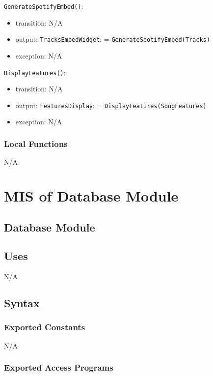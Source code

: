 \documentclass[12pt, titlepage]{article}
\begin{document}
\noindent \texttt{GenerateSpotifyEmbed()}:
\begin{itemize}
\item transition: N/A
\item output: \texttt{Tracks\textunderscore Embed\textunderscore Widget}: = \texttt{GenerateSpotifyEmbed(Tracks)}
\item exception: N/A
\end{itemize}

\noindent \texttt{DisplayFeatures()}:
\begin{itemize}
\item transition: N/A
\item output: \texttt{Features\textunderscore Display}: = \texttt{DisplayFeatures(Song\textunderscore Features)}
\item exception: N/A
\end{itemize}

\subsubsection{Local Functions}
N/A

\newpage

\section{MIS of Database Module} 

\subsection{Database Module}

\subsection{Uses}
N/A

\subsection{Syntax}

\subsubsection{Exported Constants}
N/A

\subsubsection{Exported Access Programs}
\end{document}
